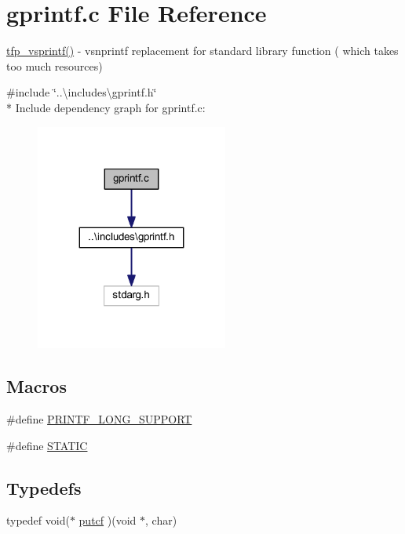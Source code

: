 \hypertarget{a00043}{\section{gprintf.\+c File Reference}
\label{a00043}
}


\hyperlink{a00043_aa8dfc5ac91747032198002a008a6aa46}{tfp\+\_\+vsprintf()} -\/ vsnprintf replacement for standard library function ( which takes too much resources)  


{\ttfamily \#include \char`\"{}..\textbackslash{}includes\textbackslash{}gprintf.\+h\char`\"{}}\\*
Include dependency graph for gprintf.\+c\+:\nopagebreak
\begin{figure}[H]
\begin{center}
\leavevmode
\includegraphics[width=179pt]{d5/d89/a00907}
\end{center}
\end{figure}
\subsection*{Macros}
\begin{DoxyCompactItemize}
\item 
\#define \hyperlink{a00043_ac346309c454e31a36e32039d9575ee3e}{P\+R\+I\+N\+T\+F\+\_\+\+L\+O\+N\+G\+\_\+\+S\+U\+P\+P\+O\+R\+T}
\item 
\#define \hyperlink{a00043_a10b2d890d871e1489bb02b7e70d9bdfb}{S\+T\+A\+T\+I\+C}
\end{DoxyCompactItemize}
\subsection*{Typedefs}
\begin{DoxyCompactItemize}
\item 
typedef void($\ast$ \hyperlink{a00043_aa2de12079c58c63cb0208a0b3df2a0b7}{putcf} )(void $\ast$, char)
\end{DoxyCompactItemize}
